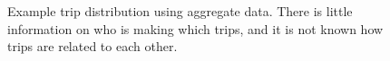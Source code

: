 \documentclass[fancy, twoside, mastersfancy, ms]{byuthesis}
\begin{document}
\begin{figure}


\caption[Example network assignment using aggregate
data.]{\label{fig-network-aggregate}Example trip distribution using
aggregate data. There is little information on who is making which
trips, and it is not known how trips are related to each other.}

\end{figure}%
\end{document}
